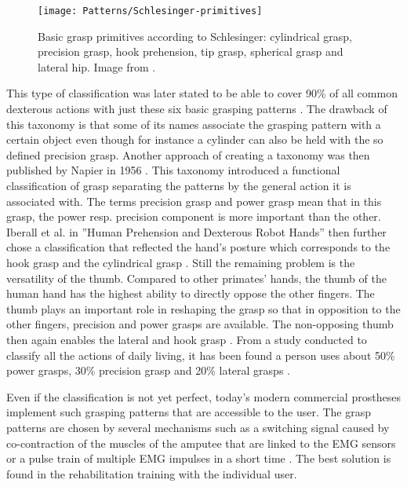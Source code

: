 \documentclass[main]{subfiles}
\begin{document}
\begin{figure}[htp]
\centering
\texttt{[image: Patterns/Schlesinger-primitives]}
\caption[Basic grasp primitives]{Basic grasp primitives according to Schlesinger: cylindrical grasp, precision grasp, hook prehension, tip grasp, spherical grasp and lateral hip. Image from \cite{Schlesinger}.}
\label{schlesinger-primitives}
\end{figure}

This type of classification was later stated to be able to cover 90\% of all common dexterous actions with just these six basic grasping patterns \cite{Schlesinger}. The drawback of this taxonomy is that some of its names associate the grasping pattern with a certain object even though for instance a cylinder can also be held with the so defined precision grasp. Another approach of creating a taxonomy was then published by Napier in 1956 \cite{Napier1956}. This taxonomy introduced a functional classification of grasp separating the patterns by the general action it is associated with. The terms precision grasp and power grasp mean that in this grasp, the power resp. precision component is more important than the other. Iberall et al. in ''Human Prehension and Dexterous Robot Hands'' then further chose a classification that reflected the hand's posture which corresponds to the hook grasp and the cylindrical grasp \cite{Iberall1997}. Still the remaining problem is the versatility of the thumb. Compared to other primates' hands, the thumb of the human hand has the highest ability to directly oppose the other fingers. The thumb plays an important role in reshaping the grasp so that in opposition to the other fingers, precision and power grasps are available. The non-opposing thumb then again enables the lateral and hook grasp \cite{Kyberd2003}. From a study conducted to classify all the actions of daily living, it has been found a person uses about 50\% power grasps, 30\% precision grasp and 20\% lateral grasps \cite{Sollerman1995}.

Even if the classification is not yet perfect, today's modern commercial prostheses implement such grasping patterns that are accessible to the user. The grasp patterns are chosen by several mechanisms such as a switching signal caused by co-contraction of the muscles of the amputee that are linked to the EMG sensors or a pulse train of multiple EMG impulses in a short time \cite{TouchBionics2013}. The best solution is found in the rehabilitation training with the individual user.
\end{document}
